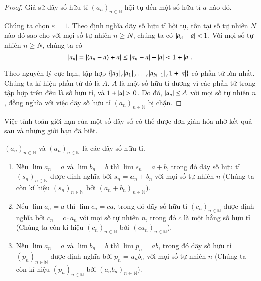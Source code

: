 \begin{proof}
    Giả sử dãy số hữu tỉ ${(a_{n})}_{n\in\mathbb{N}}$ hội tụ đến một số hữu tỉ $a$ nào đó.

    Chúng ta chọn $\varepsilon = 1$. Theo định nghĩa dãy số hữu tỉ hội tụ, tồn tại số tự nhiên $N$ nào đó sao cho với mọi số tự nhiên $n\geq N$, chúng ta có $\left\vert{a_{n} - a}\right\vert < 1$. Với mọi số tự nhiên $n\geq N$, chúng ta có
    \[
        \left\vert{a_{n}}\right\vert = \left\vert{(a_{n} - a) + a}\right\vert \leq \left\vert{a_{n} - a}\right\vert + \left\vert{a}\right\vert < 1 + \left\vert{a}\right\vert.
    \]

    Theo nguyên lý cực hạn, tập hợp $\{ \left\vert{a_{0}}\right\vert, \left\vert{a_{1}}\right\vert, \ldots, \left\vert{a_{N-1}}\right\vert, 1 + \left\vert{a}\right\vert \}$ có phần tử lớn nhất. Chúng ta kí hiệu phần tử đó là $A$. $A$ là một số hữu tỉ dương vì các phần tử trong tập hợp trên đều là số hữu tỉ, và $1 + \left\vert{a}\right\vert > 0$. Do đó, $\left\vert{a_{n}}\right\vert\leq A$ với mọi số tự nhiên $n$, đồng nghĩa với việc dãy số hữu tỉ ${(a_{n})}_{n\in\mathbb{N}}$ bị chặn.
\end{proof}

Việc tính toán giới hạn của một số dãy số có thể được đơn giản hóa nhờ kết quả sau và những giới hạn đã biết.
\begin{appendixthm}\label{appendixthm:limits-of-sum-and-product}
    ${(a_{n})}_{n\in\mathbb{N}}$ và ${(a_{n})}_{n\in\mathbb{N}}$ là các dãy số hữu tỉ.
    \begin{enumerate}[label={(\roman*)}]
        \item Nếu $\lim a_{n} = a$ và $\lim b_{n} = b$ thì $\lim s_{n} = a + b$, trong đó dãy số hữu tỉ ${(s_{n})}_{n\in\mathbb{N}}$ được định nghĩa bởi $s_{n} = a_{n} + b_{n}$ với mọi số tự nhiên $n$ (Chúng ta còn kí hiệu ${(s_{n})}_{n\in\mathbb{N}}$ bởi ${(a_{n} + b_{n})}_{n\in\mathbb{N}}$).
        \item Nếu $\lim a_{n} = a$ thì $\lim c_{n} = ca$, trong đó dãy số hữu tỉ ${(c_{n})}_{n\in\mathbb{N}}$ được định nghĩa bởi $c_{n} = c\cdot a_{n}$ với mọi số tự nhiên $n$, trong đó $c$ là một hằng số hữu tỉ (Chúng ta còn kí hiệu ${(c_{n})}_{n\in\mathbb{N}}$ bởi ${(ca_{n})}_{n\in\mathbb{N}}$).
        \item Nếu $\lim a_{n} = a$ và $\lim b_{n} = b$ thì $\lim p_{n} = ab$, trong đó dãy số hữu tỉ ${(p_{n})}_{n\in\mathbb{N}}$ được định nghĩa bởi $p_{n} = a_{n}b_{n}$ với mọi số tự nhiên $n$ (Chúng ta còn kí hiệu ${(p_{n})}_{n\in\mathbb{N}}$ bởi ${(a_{n}b_{n})}_{n\in\mathbb{N}}$).
    \end{enumerate}
\end{appendixthm}

